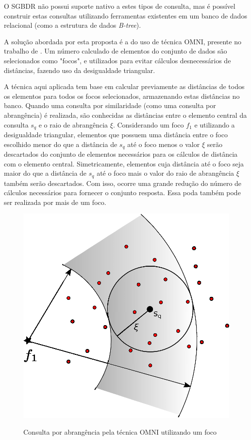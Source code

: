 O SGBDR não possui suporte nativo a estes tipos de consulta, mas é possível construir estas consultas utilizando ferramentas existentes em um banco de dados relacional (como a estrutura de dados \textit{B-tree}).\par %

A solução abordada por esta proposta é a do uso de técnica OMNI, presente no trabalho de \cite{Traina2001}. Um número calculado de elementos do conjunto de dados são selecionados como "focos", e utilizados para
evitar cálculos desnecessários de distâncias, fazendo uso da desigualdade triangular. 

A técnica aqui aplicada tem base em calcular previamente as distâncias de todos os elementos para todos os focos selecionados, armazenando estas distâncias no banco. Quando uma consulta por similaridade
(como uma consulta por abrangência) é realizada, são conhecidas as distâncias entre o elemento central da consulta $s_q$ e o raio de abrangência $\xi$. Considerando um foco ${f_1}$ e utilizando
a desigualdade triangular, elementos que possuem uma distância entre o foco escolhido menor do que a distância de $s_q$ até o foco menos o valor $\xi$ serão descartados do conjunto de elementos necessários para
os cálculos de distância com o elemento central. Simetricamente, elementos cuja distância até o foco seja maior do que a distância de $s_q$ até o foco mais o valor do raio de abrangência $\xi$ também
serão descartados. Com isso, ocorre uma grande redução do número de cálculos necessários para fornecer o conjunto resposta. Essa poda também pode ser realizada por mais de um foco.

\begin{figure}[H]
\centering
\caption{Consulta por abrangência pela técnica OMNI utilizando um foco}
\includegraphics[width=.5\textwidth]{dados/figuras/rg_omni_1.eps}
\label{fig:rqomni1}
\end{figure}


